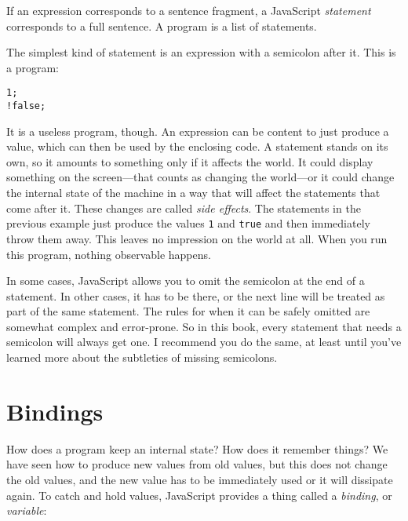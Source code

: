 If an expression corresponds to a sentence fragment, a JavaScript \emph{statement} corresponds to a full sentence. A program is a list of statements.

The simplest kind of statement is an expression with a semicolon after it. This is a program:

\begin{lstlisting}
1;
!false;
\end{lstlisting}
\noindent

It is a useless program, though. An expression can be content to just produce a value, which can then be used by the enclosing code. A statement stands on its own, so it amounts to something only if it affects the world. It could display something on the screen—that counts as changing the world—or it could change the internal state of the machine in a way that will affect the statements that come after it. These changes are called \emph{side effects}. The statements in the previous example just produce the values \lstinline`1` and \lstinline`true` and then immediately throw them away. This leaves no impression on the world at all. When you run this program, nothing observable happens.

In some cases, JavaScript allows you to omit the semicolon at the end of a statement. In other cases, it has to be there, or the next line will be treated as part of the same statement. The rules for when it can be safely omitted are somewhat complex and error-prone. So in this book, every statement that needs a semicolon will always get one. I recommend you do the same, at least until you've learned more about the subtleties of missing semicolons.

\section{Bindings}

How does a program keep an internal state? How does it remember things? We have seen how to produce new values from old values, but this does not change the old values, and the new value has to be immediately used or it will dissipate again. To catch and hold values, JavaScript provides a thing called a \emph{binding}, or \emph{variable}:

